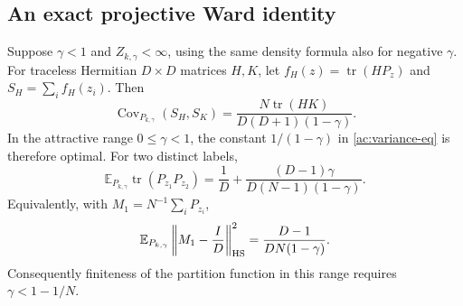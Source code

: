 \subsection{An exact projective Ward identity}

\begin{proposition}
\label{ac:ward}
Suppose $\gamma<1$ and $Z_{k,\gamma}<\infty$, using the same
density formula also for negative $\gamma$.
For traceless Hermitian $D\times D$ matrices $H,K$, let
$f_H(z)=\operatorname{tr}(HP_z)$ and $S_H=\sum_i f_H(z_i)$.
Then
\begin{equation}
 \operatorname{Cov}_{P_{k,\gamma}}(S_H,S_K)
 =\frac{N\operatorname{tr}(HK)}{D(D+1)(1-\gamma)}.
 \label{ac:ward-covariance}
\end{equation}
In the attractive range $0\le\gamma<1$, the constant
$1/(1-\gamma)$ in \eqref{ac:variance-eq} is therefore optimal.
For two distinct labels,
\begin{equation}
 \mathbb E_{P_{k,\gamma}}\operatorname{tr}(P_{z_1}P_{z_2})
 =\frac1D+
   \frac{(D-1)\gamma}{D(N-1)(1-\gamma)}.
 \label{ac:pair-overlap}
\end{equation}
Equivalently, with $M_1=N^{-1}\sum_iP_{z_i}$,
\begin{equation}
 \mathbb E_{P_{k,\gamma}}
      \left\|M_1-\frac{I}{D}\right\|_{\rm HS}^2
       =\frac{D-1}{DN(1-\gamma)}.
 \label{ac:first-moment-variance}
\end{equation}
Consequently finiteness of the partition function in this range
requires $\gamma<1-1/N$.
\end{proposition}

